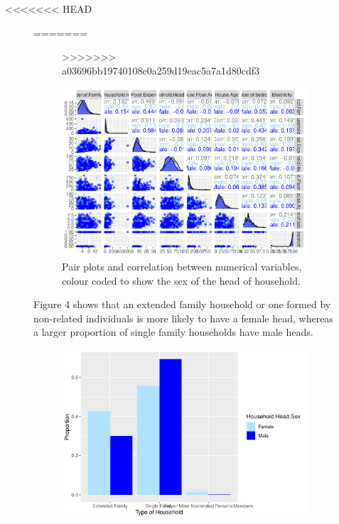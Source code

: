 \documentclass[
]{article}
\begin{document}
<<<<<<< HEAD
\begin{figure}[H]
=======
\begin{figure}
>>>>>>> a03696bb19740108c0a259d19eac5a7a1d80cdf3

{\centering \includegraphics[width=1\linewidth]{Group_01_Project2_demo_files/figure-latex/pairs-1} 

}

\caption{Pair plots and correlation between numerical variables, colour coded to show the sex of the head of household.}\label{fig:pairs}
\end{figure}

Figure 4 shows that an extended family household or one formed by
non-related individuals is more likely to have a female head, whereas a
larger proportion of single family households have male heads.

\begin{figure}[H]

{\centering \includegraphics[width=0.8\linewidth]{Group_01_Project2_demo_files/figure-latex/barplot of sex by type of household-1} 

}
\end{figure}
\end{figure}
\end{document}
